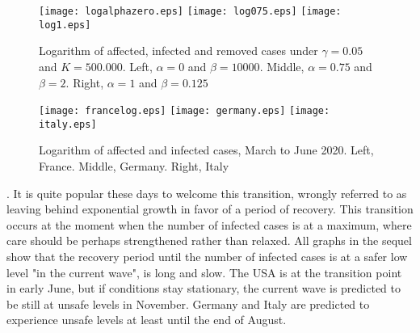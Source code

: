 \documentclass{article}
\begin{document}
\begin{figure}
	\begin{center}
	{\texttt{[image: logalphazero.eps]}}
	\qquad
	{\texttt{[image: log075.eps]}}
	\qquad
	{\texttt{[image: log1.eps]}}
	\end{center}
	\caption{Logarithm of affected, infected and removed cases under $\gamma=0.05$  and $K=500.000$. Left, $\alpha=0$ and $\beta=10000$. Middle, $\alpha=0.75$ and $\beta=2$. Right, $\alpha=1$  and $\beta=0.125$}
	\label{log075}
\end{figure}

\bigskip

\begin{figure}
\begin{center}
{\texttt{[image: francelog.eps]}}
 \qquad
{\texttt{[image: germany.eps]}}
 \qquad
{\texttt{[image: italy.eps]}}
\end{center}
\caption{Logarithm of affected and infected cases, March to June 2020. Left, France. Middle, Germany. Right, Italy}
\label{france}
\end{figure}


. It is quite popular these days to welcome this transition, wrongly referred to as leaving behind exponential growth in favor of a period of recovery. This transition occurs at the moment when the number of infected cases is at a maximum, where care should be perhaps strengthened rather than relaxed. All graphs in the sequel show that the recovery period until the number of infected cases is at a safer low level "in the current wave", is long and slow.  The USA is at the transition point in early June, but if conditions stay stationary, the current wave is predicted to be still at unsafe levels in November. Germany and Italy are predicted to experience unsafe levels at least until the end of August.
\end{document}

